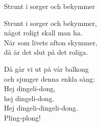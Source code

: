 \begin{song}{Strunt i sorger och bekymmer}
	
	Strunt i sorger och bekymmer,\\
	något roligt skall man ha.\\
	När som livets afton skymmer,\\
	då är det slut på det roliga.\\
	\begin{repetition}
		Då går vi ut på vår balkong\\
		och sjunger denna enkla sång:\\
		Hej dingeli-dong,\\
		hej dingeli-dong.\\
		Hej dingeli-dingeli-dong.\\
		Pling-plong!
	\end{repetition}
	
\end{song}

